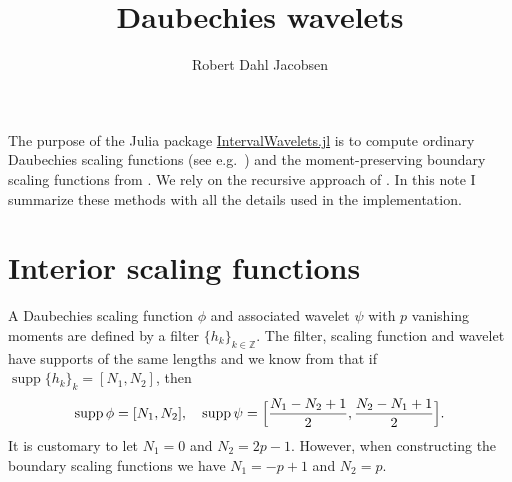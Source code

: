 \documentclass[a4paper]{scrartcl}
\title{Daubechies wavelets}
\author{Robert Dahl Jacobsen}
\newcommand\Z{\ensuremath{\mathbb{Z}}}
\DeclareMathOperator\supp{supp}
\begin{document}
\maketitle

The purpose of the Julia package \href{https://github.com/robertdj/IntervalWavelets.jl}{IntervalWavelets.jl} is to compute ordinary Daubechies scaling functions (see e.g.\ \cite{Mallat:2009}) and the moment-preserving boundary scaling functions from \cite{Cohen:Daubechies:Vial:1993}.
We rely on the recursive approach of \cite{Strang:1989}.
In this note I summarize these methods with all the details used in the implementation.


\section{Interior scaling functions}
\label{sec:internal}

A Daubechies scaling function $\phi$ and associated wavelet $\psi$ with $p$ vanishing moments are defined by a filter $\{h_k\}_{k\in\Z}$.
The filter, scaling function and wavelet have supports of the same lengths and we know from \cite[Theorem 7.5]{Mallat:2009} that if $\supp \{h_k\}_k = [N_1, N_2]$, then 
\begin{equation*}
	\supp\phi = [N_1, N_2],
	\quad
	\supp\psi = \Bigl[\frac{N_1 - N_2 + 1}2, \frac{N_2 - N_1 + 1}2\Bigr].
\end{equation*}
It is customary to let $N_1 = 0$ and $N_2 = 2p - 1$.
However, when constructing the boundary scaling functions we have $N_1 = -p+1$ and $N_2 = p$.
\end{document}
